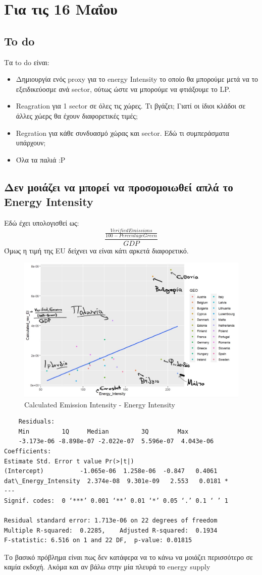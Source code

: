 \documentclass[a4paper,twoside,10pt]{article}
\begin{document}
\begin{enumerate}
\end{enumerate}

\section {Για τις 16 Μαΐου}
\subsection{To do}
Τα to do είναι:
\begin{itemize}
	\item Δημιουργία ενός proxy για το energy Intensity το οποίο θα μπορούμε μετά να το εξειδικεύοσμε ανά sector, ούτως ώστε να μπορούμε να φτιάξουμε το LP.
	\item Reagration για 1 sector σε όλες τις χώρες. Τι βγάζει; Γιατί οι ίδιοι κλάδοι σε άλλες χώερς θα έχουν διαφορετικές τιμές;
	\item Regration για κάθε συνδυασμό χώρας και sector. Εδώ τι συμπεράσματα υπάρχουν;
	\item Όλα τα παλιά :Ρ
	\end{itemize}
\subsection{Δεν μοιάζει να μπορεί να προσομοιωθεί απλά το Energy Intensity}
Εδώ έχει υπολογισθεί ως:
$$\frac{\frac{VerifiedEmissions}{100 - PercentageGreen}}{GDP}$$
Όμως η τιμή της EU δείχνει να είναι κάτι αρκετά διαφορετικό. 
\begin{figure} [H]
	\centering
	\includegraphics[width=0.7\linewidth]{images/346111264_237886352220554_6402134938597733881_n}
	\caption{Calculated Emission Intensity - Energy Intensity}
	\label{fig:3461112642378863522205546402134938597733881n}
\end{figure}


\begin{verbatim}
	Residuals:
	Min         1Q     Median         3Q        Max 
	-3.173e-06 -8.898e-07 -2.022e-07  5.596e-07  4.043e-06 
Coefficients:
Estimate Std. Error t value Pr(>|t|)  
(Intercept)          -1.065e-06  1.258e-06  -0.847   0.4061  
dat\_Energy_Intensity  2.374e-08  9.301e-09   2.553   0.0181 *
---
Signif. codes:  0 ‘***’ 0.001 ‘**’ 0.01 ‘*’ 0.05 ‘.’ 0.1 ‘ ’ 1

Residual standard error: 1.713e-06 on 22 degrees of freedom
Multiple R-squared:  0.2285,	Adjusted R-squared:  0.1934 
F-statistic: 6.516 on 1 and 22 DF,  p-value: 0.01815
\end{verbatim}
Το βασικό πρόβλημα είναι πως δεν κατάφερα να το κάνω να μοιάζει περισσότερο σε καμία εκδοχή. Ακόμα και αν βάλω στην μία πλευρά το energy supply
\end{document}
